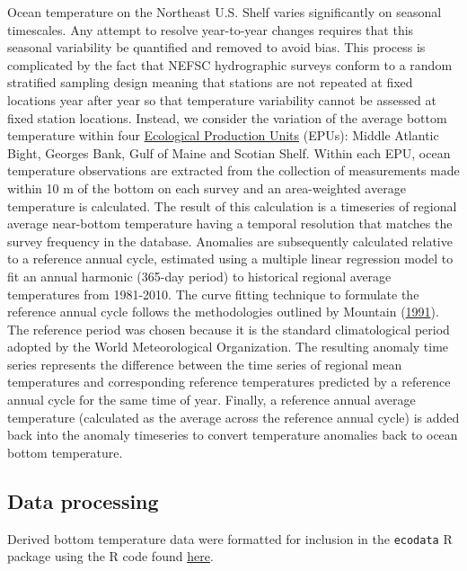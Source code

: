 \documentclass[
]{book}
\begin{document}
Ocean temperature on the Northeast U.S. Shelf varies significantly on seasonal timescales. Any attempt to resolve year-to-year changes requires that this seasonal variability be quantified and removed to avoid bias. This process is complicated by the fact that NEFSC hydrographic surveys conform to a random stratified sampling design meaning that stations are not repeated at fixed locations year after year so that temperature variability cannot be assessed at fixed station locations. Instead, we consider the variation of the average bottom temperature within four \protect\hyperlink{epu}{Ecological Production Units} (EPUs): Middle Atlantic Bight, Georges Bank, Gulf of Maine and Scotian Shelf. Within each EPU, ocean temperature observations are extracted from the collection of measurements made within 10 m of the bottom on each survey and an area-weighted average temperature is calculated. The result of this calculation is a timeseries of regional average near-bottom temperature having a temporal resolution that matches the survey frequency in the database. Anomalies are subsequently calculated relative to a reference annual cycle, estimated using a multiple linear regression model to fit an annual harmonic (365-day period) to historical regional average temperatures from 1981-2010. The curve fitting technique to formulate the reference annual cycle follows the methodologies outlined by Mountain (\protect\hyperlink{ref-mountain1991}{1991}). The reference period was chosen because it is the standard climatological period adopted by the World Meteorological Organization. The resulting anomaly time series represents the difference between the time series of regional mean temperatures and corresponding reference temperatures predicted by a reference annual cycle for the same time of year. Finally, a reference annual average temperature (calculated as the average across the reference annual cycle) is added back into the anomaly timeseries to convert temperature anomalies back to ocean bottom temperature.

\hypertarget{data-processing-2}{%
\subsection{Data processing}\label{data-processing-2}}

Derived bottom temperature data were formatted for inclusion in the \texttt{ecodata} R package using the R code found \href{https://github.com/NOAA-EDAB/ecodata/blob/master/data-raw/get_bottom_temp.R}{here}.
\end{document}
